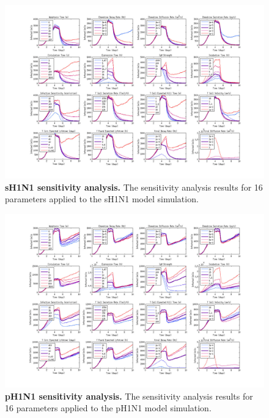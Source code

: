 \documentclass[10pt]{article}
\begin{document}
\begin{figure}[ht!]
\begin{center}
	\includegraphics[width=\textwidth]{Figure_S4}
	\caption{\textbf{sH1N1 sensitivity analysis.} The sensitivity analysis results for 16 parameters applied to the sH1N1 model simulation.}
	\label{fig:ssensitivity}
\end{center}
\end{figure}

\begin{figure}[ht!]
\begin{center}
	\includegraphics[width=\textwidth]{Figure_S5}
	\caption{\textbf{pH1N1 sensitivity analysis.} The sensitivity analysis results for 16 parameters applied to the pH1N1 model simulation.}
	\label{fig:psensitivity}
\end{center}
\end{figure}
\end{document}
